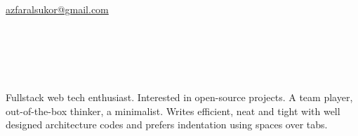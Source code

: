 \documentclass[9pt]{developercv} %
\begin{document}
\begin{minipage}[t]{0.275\textwidth} %
	\vspace{-\baselineskip} %
	\href{mailto:azfaralsukor@gmail.com}{}{\href{mailto:azfaralsukor@gmail.com}{azfaralsukor@gmail.com}}

	\href{whatsapp://send?phone=60192968478}{}\\
	\href{https://www.linkedin.com/in/azfaralsukor}{}\\
\end{minipage}

\vspace{0.5cm}



\begin{minipage}[t]{0.4\textwidth} %
	\vspace{-\baselineskip} %
\\
\\	Fullstack web tech enthusiast. 
	Interested in open-source projects. 
	A team player, out-of-the-box thinker, a minimalist.
	Writes efficient, neat and tight with well designed architecture codes and 
	prefers indentation using spaces over tabs. 
	
\end{minipage}
\hfill %
\begin{minipage}[t]{0.5\textwidth}
\\
	\vspace{-\baselineskip} %
	\begin{barchart}{4}
	\end{barchart}
\end{minipage}
\end{document}

